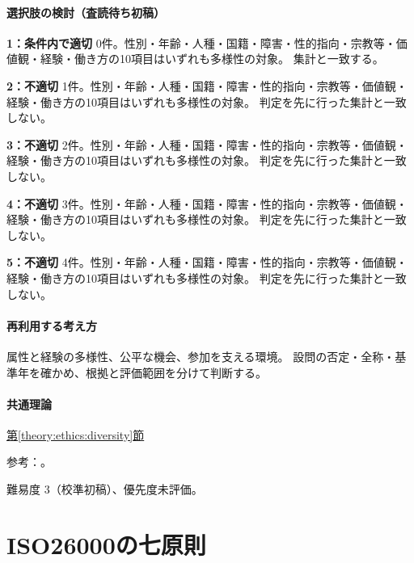 \paragraph{選択肢の検討（査読待ち初稿）}\mbox{}\par

\noindent\textbf{1：条件内で適切} 0件。性別・年齢・人種・国籍・障害・性的指向・宗教等・価値観・経験・働き方の10項目はいずれも多様性の対象。 集計と一致する。\par

\noindent\textbf{2：不適切} 1件。性別・年齢・人種・国籍・障害・性的指向・宗教等・価値観・経験・働き方の10項目はいずれも多様性の対象。 判定を先に行った集計と一致しない。\par

\noindent\textbf{3：不適切} 2件。性別・年齢・人種・国籍・障害・性的指向・宗教等・価値観・経験・働き方の10項目はいずれも多様性の対象。 判定を先に行った集計と一致しない。\par

\noindent\textbf{4：不適切} 3件。性別・年齢・人種・国籍・障害・性的指向・宗教等・価値観・経験・働き方の10項目はいずれも多様性の対象。 判定を先に行った集計と一致しない。\par

\noindent\textbf{5：不適切} 4件。性別・年齢・人種・国籍・障害・性的指向・宗教等・価値観・経験・働き方の10項目はいずれも多様性の対象。 判定を先に行った集計と一致しない。\par

\paragraph{再利用する考え方} 属性と経験の多様性、公平な機会、参加を支える環境。 設問の否定・全称・基準年を確かめ、根拠と評価範囲を分けて判断する。

\paragraph{共通理論} \hyperref[theory:ethics:diversity]{第\ref*{theory:ethics:diversity}節}

\par 参考：\cite{eth54_dei2025}。

\par 難易度 3（校準初稿）、優先度未評価。

\section{ISO26000の七原則}


